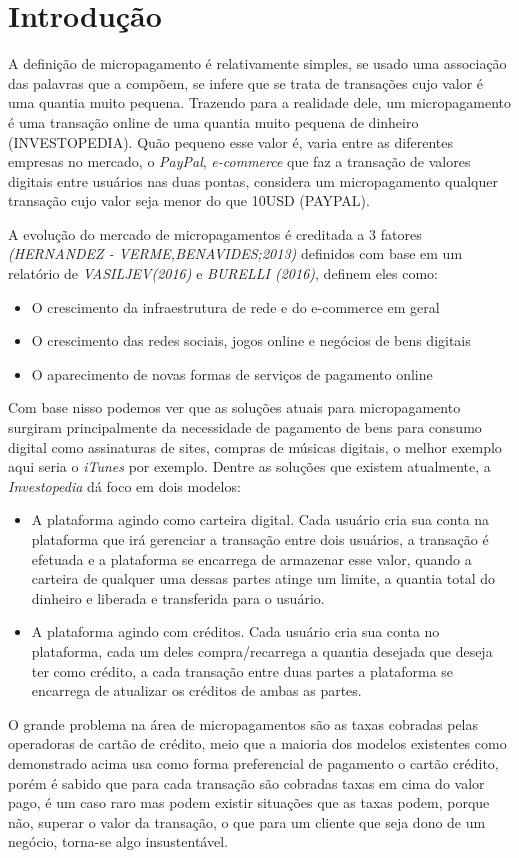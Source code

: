 \documentclass[hidelinks,12pt]{article}
\begin{document}
\section{Introdu\c{c}\~ao}
A defini\c{c}\~ao de micropagamento \'e relativamente simples, se usado uma associa\c{c}\~ao das palavras que a comp\~oem, se infere que se trata de transa\c{c}\~oes cujo valor \'e uma quantia muito pequena. Trazendo para a realidade dele, um micropagamento \'e uma transa\c{c}\~ao online de uma quantia muito pequena de dinheiro (INVESTOPEDIA). Qu\~ao pequeno esse valor \'e, varia entre as diferentes empresas no mercado, o \textit{PayPal}, \textit{e-commerce} que faz a transa\c{c}\~ao de valores digitais entre usu\'arios nas duas pontas, considera um micropagamento qualquer transa\c{c}\~ao cujo valor seja menor do que 10USD (PAYPAL).

A evolu\c{c}\~ao do mercado de  micropagamentos \'e creditada a 3 fatores \textit{(HERNANDEZ - VERME,BENAVIDES;2013)} definidos com base em um relat\'orio de \textit{VASILJEV(2016)} e \textit{BURELLI (2016)}, definem eles como: 
\begin{itemize}
	\item O crescimento da infraestrutura de rede e do e-commerce em geral
	\item O crescimento das redes sociais, jogos online e neg\'ocios de bens digitais
	\item O aparecimento de novas formas de servi\c{c}os de pagamento online
\end{itemize}
Com base nisso podemos ver que as solu\c{c}\~oes atuais para micropagamento surgiram principalmente da necessidade de pagamento de bens para consumo digital como assinaturas de sites, compras de m\'usicas digitais, o melhor exemplo aqui seria o \textit{iTunes} por exemplo.
Dentre as solu\c{c}\~oes que existem atualmente, a \textit{Investopedia} d\'a foco em dois modelos:
\begin{itemize}
	\item A plataforma agindo como carteira digital. Cada usu\'ario cria sua conta na plataforma que ir\'a gerenciar a transa\c{c}\~ao entre dois usu\'arios, a transa\c{c}\~ao \'e efetuada e a plataforma se encarrega de armazenar esse valor, quando a carteira de qualquer uma dessas partes atinge um limite, a quantia total do dinheiro e liberada e transferida para o usu\'ario.
	\item A plataforma agindo com cr\'editos. Cada usu\'ario cria sua conta no plataforma, cada um deles compra/recarrega a quantia desejada que deseja ter como cr\'edito, a cada transa\c{c}\~ao entre duas partes a plataforma se encarrega de atualizar os cr\'editos de ambas as partes.
\end{itemize}
O grande problema na \'area de micropagamentos s\~ao as taxas cobradas pelas operadoras de cart\~ao de cr\'edito, meio que a maioria dos modelos existentes como demonstrado acima usa como forma preferencial de pagamento o cart\~ao cr\'edito, por\'em \'e sabido que para cada transa\c{c}\~ao s\~ao cobradas taxas em cima do valor pago, \'e um caso raro mas podem existir situa\c{c}\~oes que as taxas podem, porque n\~ao, superar o valor da transa\c{c}\~ao, o que para um cliente que seja dono de um neg\'ocio, torna-se algo insustent\'avel.
\newpage
\end{document}
